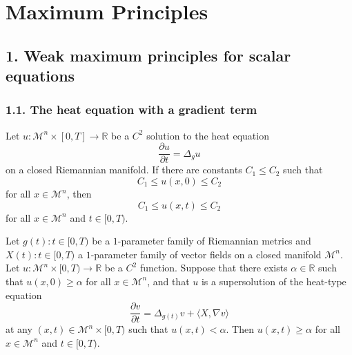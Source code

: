 \chapter{Maximum Principles}

\section*{1. Weak maximum principles for scalar equations}

\subsection*{1.1. The heat equation with a gradient term}

\begin{proposition}
\label{ch04-prop-scalar-max-principle-pointwise-bounds}
Let \(u : \mathcal M^n \times [0,T] \to \mathbb R\) be a \(C^2\) solution to the heat equation
\[
\frac{\partial u}{\partial t} = \Delta_g u
\]
on a closed Riemannian manifold. If there are constants \(C_1 \le C_2\) such that
\[
C_1 \le u(x,0) \le C_2
\]
for all \(x \in \mathcal M^n\), then
\[
C_1 \le u(x,t) \le C_2
\]
for all \(x \in \mathcal M^n\) and \(t \in [0,T)\).
\end{proposition}

\begin{theorem}
\label{ch04-thm-scalar-max-principle-supersolution-lower-bound}
Let \(g(t) : t \in [0,T)\) be a \(1\)-parameter family of Riemannian metrics and \(X(t) : t \in [0,T)\) a \(1\)-parameter family of vector fields on a closed manifold \(\mathcal M^n\). Let \(u : \mathcal M^n \times [0,T) \to \mathbb R\) be a \(C^2\) function. Suppose that there exists \(\alpha \in \mathbb R\) such that \(u(x,0) \ge \alpha\) for all \(x \in \mathcal M^n\), and that \(u\) is a supersolution of the heat-type equation
\[
\frac{\partial v}{\partial t} = \Delta_{g(t)} v + \langle X, \nabla v \rangle
\]
at any \((x,t) \in \mathcal M^n \times [0,T)\) such that \(u(x,t) < \alpha\). Then \(u(x,t) \ge \alpha\) for all \(x \in \mathcal M^n\) and \(t \in [0,T)\).
\end{theorem}

